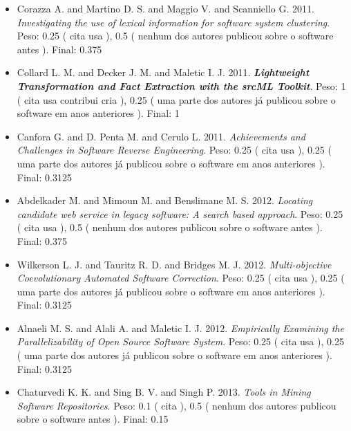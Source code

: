 \begin{itemize}
\item Corazza A. and Martino D. S. and Maggio V. and Scanniello G.
      2011.
        \textit{ Investigating the use of lexical information for software system clustering}.
      Peso:
      0.25 (
          cita
          usa
      ),
      0.5 (
nenhum dos autores publicou sobre o software antes
      ).
      Final:
      0.375

\item Collard L. M. and Decker J. M. and Maletic I. J.
      2011.
        \textbf{\textit{ Lightweight Transformation and Fact Extraction with the srcML Toolkit}}.
      Peso:
      1 (
          cita
          usa
          contribui
          cria
      ),
      0.25 (
uma parte dos autores já publicou sobre o software em anos anteriores
      ).
      Final:
      1

\item Canfora G. and D. Penta M. and Cerulo L.
      2011.
        \textit{ Achievements and Challenges in Software Reverse Engineering}.
      Peso:
      0.25 (
          cita
          usa
      ),
      0.25 (
uma parte dos autores já publicou sobre o software em anos anteriores
      ).
      Final:
      0.3125

\item Abdelkader M. and Mimoun M. and Benslimane M. S.
      2012.
        \textit{ Locating candidate web service in legacy software: A search based approach}.
      Peso:
      0.25 (
          cita
          usa
      ),
      0.5 (
nenhum dos autores publicou sobre o software antes
      ).
      Final:
      0.375

\item Wilkerson L. J. and Tauritz R. D. and Bridges M. J.
      2012.
        \textit{ Multi-objective Coevolutionary Automated Software Correction}.
      Peso:
      0.25 (
          cita
          usa
      ),
      0.25 (
uma parte dos autores já publicou sobre o software em anos anteriores
      ).
      Final:
      0.3125

\item Alnaeli M. S. and Alali A. and Maletic I. J.
      2012.
        \textit{ Empirically Examining the Parallelizability of Open Source Software System}.
      Peso:
      0.25 (
          cita
          usa
      ),
      0.25 (
uma parte dos autores já publicou sobre o software em anos anteriores
      ).
      Final:
      0.3125

\item Chaturvedi K. K. and Sing B. V. and Singh P.
      2013.
        \textit{ Tools in Mining Software Repositories}.
      Peso:
      0.1 (
          cita
      ),
      0.5 (
nenhum dos autores publicou sobre o software antes
      ).
      Final:
      0.15


\end{itemize}
